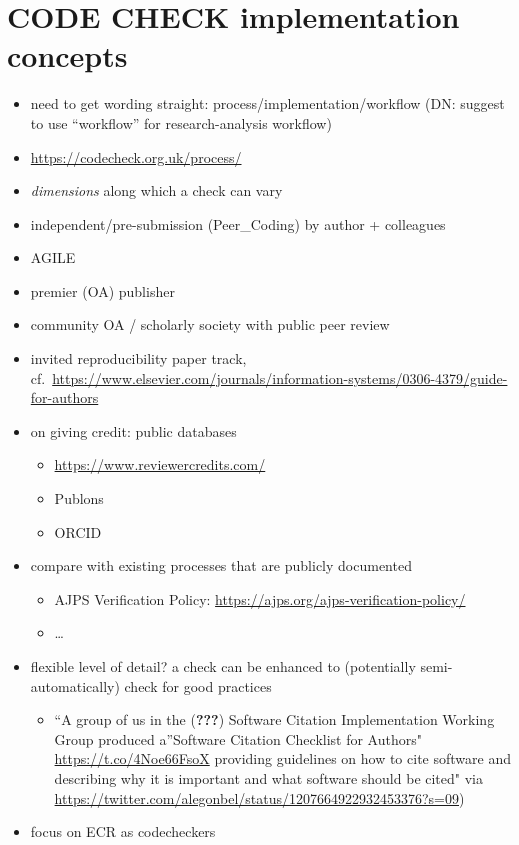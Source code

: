 \documentclass[12pt]{article}
\begin{document}
\section*{CODE CHECK implementation concepts}\label{code-check-implementation-concepts}

\begin{itemize}
\item
  need to get wording straight: process/implementation/workflow (DN:
  suggest to use ``workflow'' for research-analysis workflow)
\item
  \url{https://codecheck.org.uk/process/}
\item
  \emph{dimensions} along which a check can vary
\item
  independent/pre-submission (Peer\_Coding) by author + colleagues
\item
  AGILE
\item
  premier (OA) publisher
\item
  community OA / scholarly society with public peer review
\item
  invited reproducibility paper track,
  cf.~\url{https://www.elsevier.com/journals/information-systems/0306-4379/guide-for-authors}
\item
  on giving credit: public databases

  \begin{itemize}
  \item
    \url{https://www.reviewercredits.com/}
  \item
    Publons
  \item
    ORCID
  \end{itemize}
\item
  compare with existing processes that are publicly documented

  \begin{itemize}
  \item
    AJPS Verification Policy:
    \url{https://ajps.org/ajps-verification-policy/}
  \item
    \ldots{}
  \end{itemize}
\item
  flexible level of detail? a check can be enhanced to (potentially
  semi-automatically) check for good practices

  \begin{itemize}
  \item
    ``A group of us in the ({\textbf{???}}) Software Citation
    Implementation Working Group produced a''Software Citation Checklist
    for Authors" \url{https://t.co/4Noe66FsoX} providing guidelines on
    how to cite software and describing why it is important and what
    software should be cited" via
    \url{https://twitter.com/alegonbel/status/1207664922932453376?s=09})
  \end{itemize}
\item
  focus on ECR as codecheckers


\end{itemize}
\end{document}
